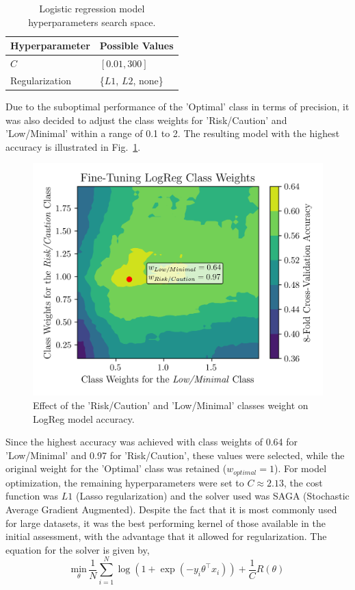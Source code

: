 \documentclass[conference]{IEEEtran}
\begin{document}
\begin{table}[H]
\centering
\caption{Logistic regression model hyperparameters search space.}
\label{parametrosLogReg}
\begin{tabular}{ll}
\toprule
\textbf{Hyperparameter} & \textbf{Possible Values} \\
\midrule
$C$ & $[0.01, 300]$ \\ 
Regularization & \{$L1$, $L2$, none\} \\
\bottomrule
\end{tabular}
\end{table} %

Due to the suboptimal performance of the 'Optimal' class in terms of precision, it was also decided to adjust the class weights for 'Risk/Caution' and 'Low/Minimal' within a range of 0.1 to 2. The resulting model with the highest accuracy is illustrated in Fig.~\ref{logregWt}.

\begin{figure}[H]
    \centering
    \includegraphics[width=.9\linewidth]{assets/LOGR_class_weights.png}
    \caption{Effect of the 'Risk/Caution' and 'Low/Minimal' classes weight on LogReg model accuracy.}
    \label{logregWt}
\end{figure} %

Since the highest accuracy was achieved with class weights of 0.64 for 'Low/Minimal' and 0.97 for 'Risk/Caution', these values were selected, while the original weight for the 'Optimal' class was retained ($w_{optimal} = 1$). For model optimization, the remaining hyperparameters were set to $C \approx 2.13$, the cost function was $L1$ (Lasso regularization) and the solver used was SAGA (Stochastic Average Gradient Augmented). Despite the fact that it is most commonly used for large datasets, it was the best performing kernel of those available in the initial assessment, with the advantage that it allowed for regularization. The equation for the solver is given by,
\begin{equation*}
\underset{\theta}{\text{min}} \, \frac{1}{N} \sum_{i=1}^{N} \log\left(1 + \exp\left(-y_i \theta^\top x_i\right)\right) + \frac{1}{C} R(\theta)
\end{equation*} %
\end{document}
